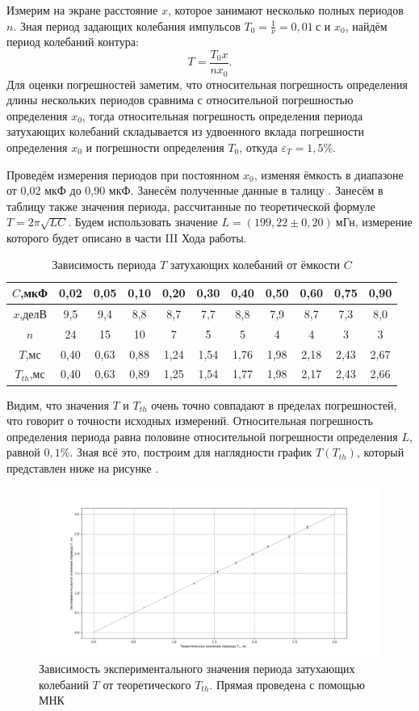 \documentclass[a4paper,10pt]{article}
\begin{document}
Измерим на экране расстояние $x$, которое занимают несколько полных периодов $n$. Зная период задающих колебания импульсов $T_0=\frac{1}{\nu}=0,01~\text{с}$ и $x_0$, найдём период колебаний контура:\[T=\frac{T_0x}{nx_0}.\]Для оценки погрешностей заметим, что относительная погрешность определения длины нескольких периодов сравнима с относительной погрешностью определения $x_0$, тогда относительная погрешность определения периода затухающих колебаний складывается из удвоенного вклада погрешности определения $x_0$ и погрешности определения $T_0$, откуда $\varepsilon_T=1,5\%$.

Проведём измерения периодов при постоянном $x_0$, изменяя ёмкость в диапазоне от 0,02 мкФ до 0,90 мкФ. Занесём полученные данные в талицу . Занесём в таблицу также значения периода, рассчитанные по теоретической формуле $T=2\pi\sqrt{LC}$. Будем использовать значение $L=\left(199,22\pm0,20\right)~\text{мГн}$, измерение которого будет описано в части III Хода работы.

\begin{table}[h]
	\centering
	\caption{Зависимость периода $T$ затухающих колебаний от ёмкости $C$} \label{per}
	\begin{tabular}{|c|c|c|c|c|c|c|c|c|c|c|}
		\hline
		$C$,мкФ&0,02&0,05&0,10&0,20&0,30&0,40&0,50&0,60&0,75&0,90\\ \hline
		$x$,делВ&9,5&9,4&8,8&8,7&7,7&8,8&7,9&8,7&7,3&8,0\\ \hline
		$n$&24&15&10&7&5&5&4&4&3&3\\ \hline
		$T$,мс&0,40&0,63&0,88&1,24&1,54&1,76&1,98&2,18&2,43&2,67\\ \hline
		$T_{th}$,мс&0,40&0,63&0,89&1,25&1,54&1,77&1,98&2,17&2,43&2,66\\ \hline
	\end{tabular}
\end{table}

Видим, что значения $T$ и $T_{th}$ очень точно совпадают в пределах погрешностей, что говорит о точности исходных измерений. Относительная погрешность определения периода равна половине относительной погрешности определения $L$, равной $0,1\%$. Зная всё это, построим для наглядности график $T(T_{th})$, который представлен ниже на рисунке .

\begin{figure}[h]
	\centering
	\includegraphics[scale=0.33]{rofl}
	\caption{Зависимость экспериментального значения периода затухающих колебаний $T$ от теоретического $T_{th}$. Прямая проведена с помощью МНК} \label{rofl}
\end{figure}
\end{document}
